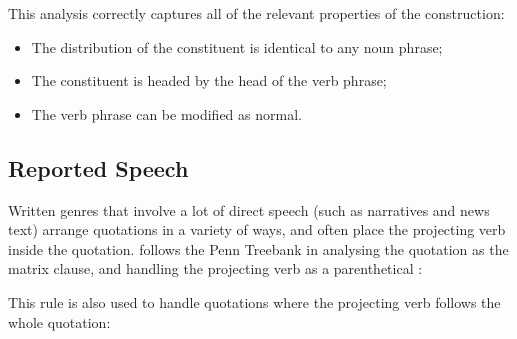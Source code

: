This analysis correctly captures all of the relevant properties of the
construction:

\begin{itemize}
\item The distribution of the constituent is identical to any noun phrase;
\item The constituent is headed by the head of the verb phrase;
\item The verb phrase can be modified as normal.
\end{itemize}


\subsection{Reported Speech}
\label{sec:hat_speech}
Written genres that involve a lot of direct speech (such as narratives and news
text) arrange quotations in a variety of ways, and often place the projecting
verb inside the quotation. \ccgbank follows the Penn Treebank in analysing the
quotation as the matrix clause, and handling the projecting verb as a
parenthetical \citep{bies:95}:

\begin{center}
\end{center}

\noindent This rule is also used to handle quotations where the projecting verb
follows the whole quotation:

